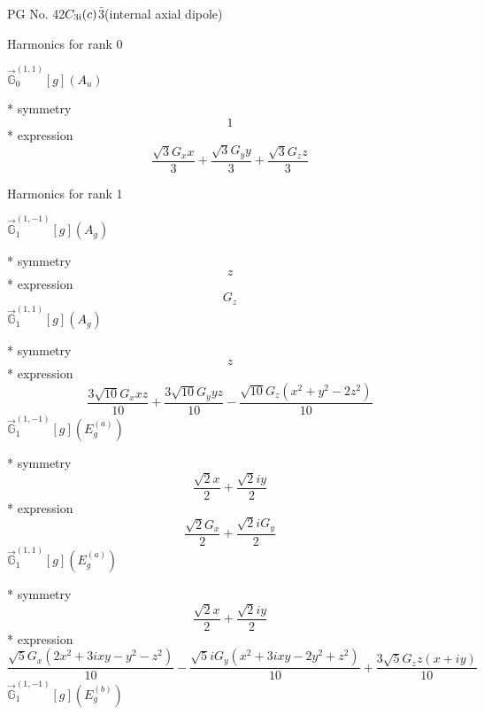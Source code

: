 \documentclass[fleqn,8pt]{jsarticle}
\begin{document}
\setcounter{MaxMatrixCols}{32}

\renewcommand{\tablename}{Table~}
\renewcommand{\figurename}{Figure~}
\begin{center}
\LARGE
PG No. 42\quad$C_{\rm 3i}(c)$\quad$\bar{3}$\quad[ trigonal ] (internal axial dipole)
\end{center}

\noindent * Harmonics for rank 0

\noindent\quad $\vec{\mathbb{G}}_{0}^{(1,1)}[g](A_{u})$

\noindent\quad ** symmetry
\begin{dmath*}
1
\end{dmath*}
\noindent\quad ** expression
\begin{dmath*}
\frac{\sqrt{3} G_{x} x}{3} + \frac{\sqrt{3} G_{y} y}{3} + \frac{\sqrt{3} G_{z} z}{3}
\end{dmath*}

\noindent * Harmonics for rank 1

\noindent\quad $\vec{\mathbb{G}}_{1}^{(1,-1)}[g](A_{g})$

\noindent\quad ** symmetry
\begin{dmath*}
z
\end{dmath*}
\noindent\quad ** expression
\begin{dmath*}
G_{z}
\end{dmath*}
\noindent\quad $\vec{\mathbb{G}}_{1}^{(1,1)}[g](A_{g})$

\noindent\quad ** symmetry
\begin{dmath*}
z
\end{dmath*}
\noindent\quad ** expression
\begin{dmath*}
\frac{3 \sqrt{10} G_{x} x z}{10} + \frac{3 \sqrt{10} G_{y} y z}{10} - \frac{\sqrt{10} G_{z} \left(x^{2} + y^{2} - 2 z^{2}\right)}{10}
\end{dmath*}
\noindent\quad $\vec{\mathbb{G}}_{1}^{(1,-1)}[g](E_{g}^{(a)})$

\noindent\quad ** symmetry
\begin{dmath*}
\frac{\sqrt{2} x}{2} + \frac{\sqrt{2} i y}{2}
\end{dmath*}
\noindent\quad ** expression
\begin{dmath*}
\frac{\sqrt{2} G_{x}}{2} + \frac{\sqrt{2} i G_{y}}{2}
\end{dmath*}
\noindent\quad $\vec{\mathbb{G}}_{1}^{(1,1)}[g](E_{g}^{(a)})$

\noindent\quad ** symmetry
\begin{dmath*}
\frac{\sqrt{2} x}{2} + \frac{\sqrt{2} i y}{2}
\end{dmath*}
\noindent\quad ** expression
\begin{dmath*}
\frac{\sqrt{5} G_{x} \left(2 x^{2} + 3 i x y - y^{2} - z^{2}\right)}{10} - \frac{\sqrt{5} i G_{y} \left(x^{2} + 3 i x y - 2 y^{2} + z^{2}\right)}{10} + \frac{3 \sqrt{5} G_{z} z \left(x + i y\right)}{10}
\end{dmath*}
\noindent\quad $\vec{\mathbb{G}}_{1}^{(1,-1)}[g](E_{g}^{(b)})$
\end{document}
